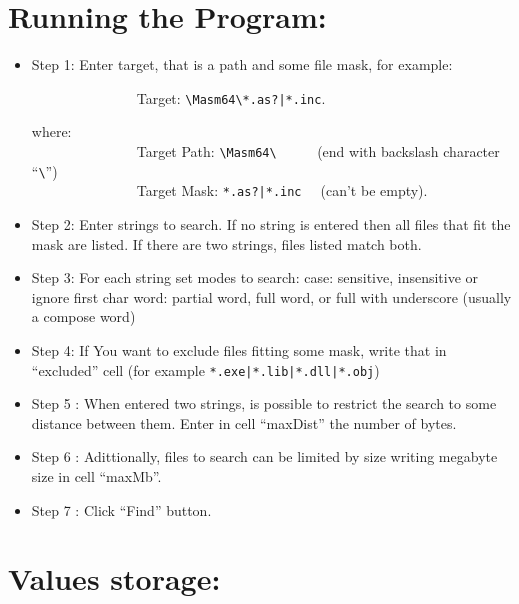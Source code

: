 \documentclass[11pt,a4paper]{scrartcl}
\begin{document}
\title{\color{myblue}{LookingFor }}
\subtitle{\color{myblue}{A Masm64 tool to find strings in files}}

\author{Héctor S. Enrique}
\date{ may 15, 2024}
\maketitle

\section{Running the Program: }

    \begin{itemize}
        \item Step 1: Enter target, that is a path and some file mask, for example:
         
        \verb$              $ Target: \verb$\Masm64\*.as?|*.inc$. 
        
	\hspace{1cm} where:\\
        \verb$              $ Target Path: \verb$\Masm64\     $  (end with backslash character ``\verb$\$'') \\
        \verb$              $ Target Mask: \verb$*.as?|*.inc  $  (can't be empty). 
        
        \item Step 2: Enter strings to search. If no string is entered then all files that fit the mask are listed. If there are two strings, files listed match both.
        \item Step 3: For each string set modes to search:
	 \subitem case: sensitive, insensitive or ignore first char
	 \subitem word: partial word, full word, or full with underscore (usually a compose word) 
        \item Step 4:  If You want to exclude files fitting some mask, write that in ``excluded'' cell (for example \verb$*.exe|*.lib|*.dll|*.obj$)
        \item Step 5 : When entered two strings, is possible to restrict the search to some distance between them. Enter in cell ``maxDist'' the number of bytes.
        \item Step 6 : Adittionally, files to search can be limited by size writing megabyte size in cell ``maxMb''.
        \item Step 7 : Click ``Find'' button.
     \end{itemize}

\section{Values storage: }
\end{document}

